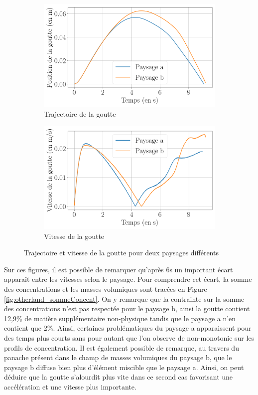 \begin{figure}[H] 
	\centering
	\begin{subfigure}[H]{0.47\textwidth}
		\centering
		\includegraphics[width=\textwidth]{figure/influence_Landscape_position.png}
		\caption{Trajectoire de la goutte}
	\end{subfigure} 
	\begin{subfigure}[H]{0.47\textwidth}
		\centering
		\includegraphics[width=\textwidth]{figure/influence_Landscape_vitesse.png}
		\caption{Vitesse de la goutte}
	\end{subfigure}
	\caption{Trajectoire et vitesse de la goutte pour deux paysages différents}
	\label{fig:impactpaysage}
\end{figure}
Sur ces figures, il est possible de remarquer qu'après 6s un important écart apparaît entre les vitesses selon le paysage. Pour comprendre cet écart, la somme des concentrations et les masses volumiques sont tracées en Figure \ref{fig:otherland_sommeConcent}. On y remarque que la contrainte sur la somme des concentrations n'est pas respectée pour le paysage b, ainsi la goutte contient 12,9\% de matière supplémentaire non-physique tandis que le paysage a n'en contient que 2\%. Ainsi, certaines problématiques du paysage a apparaissent pour des temps plus courts sans pour autant que l'on observe de non-monotonie sur les profils de concentration. Il est également possible de remarque, au travers du panache présent dans le champ de masses volumiques du paysage b, que le paysage b diffuse bien plus d'élément miscible que le paysage a. Ainsi, on peut déduire que la goutte s'alourdit plus vite dans ce second cas favorisant une accélération et une vitesse plus importante.
